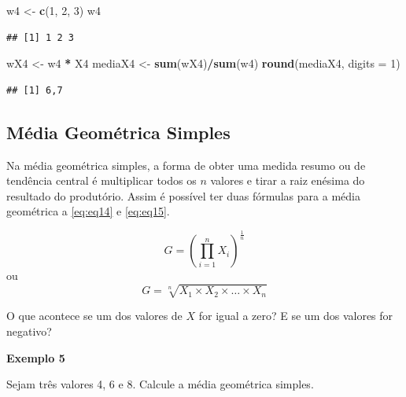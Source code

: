 \documentclass[
]{book}
\newenvironment{Shaded}{\begin{snugshade}}{\end{snugshade}}
\newcommand{\DataTypeTok}[1]{\textcolor[rgb]{0.13,0.29,0.53}{#1}}
\newcommand{\DecValTok}[1]{\textcolor[rgb]{0.00,0.00,0.81}{#1}}
\newcommand{\KeywordTok}[1]{\textcolor[rgb]{0.13,0.29,0.53}{\textbf{#1}}}
\newcommand{\NormalTok}[1]{#1}
\newcommand{\OperatorTok}[1]{\textcolor[rgb]{0.81,0.36,0.00}{\textbf{#1}}}
\newcommand{\StringTok}[1]{\textcolor[rgb]{0.31,0.60,0.02}{#1}}
\begin{document}
\begin{Shaded}
\begin{Highlighting}[]
\NormalTok{w4 <-}\StringTok{ }\KeywordTok{c}\NormalTok{(}\DecValTok{1}\NormalTok{, }\DecValTok{2}\NormalTok{, }\DecValTok{3}\NormalTok{)}
\NormalTok{w4}
\end{Highlighting}
\end{Shaded}

\begin{verbatim}
## [1] 1 2 3
\end{verbatim}

\begin{Shaded}
\begin{Highlighting}[]
\NormalTok{wX4 <-}\StringTok{ }\NormalTok{w4 }\OperatorTok{*}\StringTok{ }\NormalTok{X4}
\NormalTok{mediaX4 <-}\StringTok{ }\KeywordTok{sum}\NormalTok{(wX4)}\OperatorTok{/}\KeywordTok{sum}\NormalTok{(w4)}
\KeywordTok{round}\NormalTok{(mediaX4, }\DataTypeTok{digits =} \DecValTok{1}\NormalTok{)}
\end{Highlighting}
\end{Shaded}

\begin{verbatim}
## [1] 6,7
\end{verbatim}

\hypertarget{muxe9dia-geomuxe9trica-simples}{%
\subsection{Média Geométrica Simples}\label{muxe9dia-geomuxe9trica-simples}}

Na média geométrica simples, a forma de obter uma medida resumo ou de tendência central é multiplicar todos os \(n\) valores e tirar a raiz enésima do resultado do produtório. Assim é possível ter duas fórmulas para a média geométrica a \eqref{eq:eq14} e \eqref{eq:eq15}.

\begin{equation}
    G = \left(\prod_{i=1}^{n} X_i \right)^{\frac{1}{n}}
    \label{eq:eq14}
\end{equation}
ou
\begin{equation}
    G = \sqrt[n]{X_1 \times X_2 \times \ldots \times X_n}
    \label{eq:eq15}
\end{equation}

O que acontece se um dos valores de \(X\) for igual a zero? E se um dos valores for negativo?

\textbf{Exemplo 5}

Sejam três valores 4, 6 e 8. Calcule a média geométrica simples.
\end{document}
